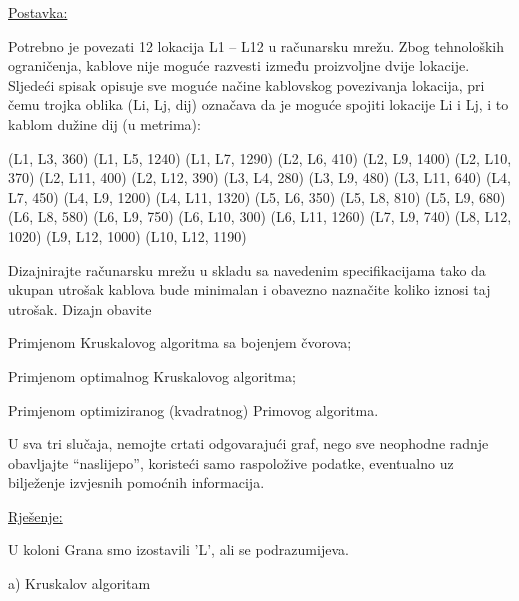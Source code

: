 \documentclass[12pt]{article}
\begin{document}
\underline{Postavka:}

Potrebno je povezati 12 lokacija L1 – L12 u računarsku mrežu. Zbog tehnoloških ograničenja, kablove nije moguće razvesti između proizvoljne dvije lokacije. Sljedeći spisak opisuje sve moguće načine kablovskog povezivanja lokacija, pri čemu trojka oblika (Li, Lj, dij) označava da je moguće spojiti lokacije Li i Lj, i to kablom dužine dij (u metrima): 

(L1, L3, 360)   (L1, L5, 1240)   (L1, L7, 1290)   (L2, L6, 410)   (L2, L9, 1400)   (L2, L10, 370)   (L2, L11, 400)   (L2, L12, 390)   (L3, L4, 280)   (L3, L9, 480)   (L3, L11, 640)   (L4, L7, 450)   (L4, L9, 1200)   (L4, L11, 1320)   (L5, L6, 350)   (L5, L8, 810)   (L5, L9, 680)   (L6, L8, 580)   (L6, L9, 750)   (L6, L10, 300)   (L6, L11, 1260)   (L7, L9, 740)   (L8, L12, 1020)   (L9, L12, 1000)   (L10, L12, 1190)   


Dizajnirajte računarsku mrežu u skladu sa navedenim specifikacijama tako da ukupan utrošak kablova bude minimalan i obavezno naznačite koliko iznosi taj utrošak. Dizajn obavite

Primjenom Kruskalovog algoritma sa bojenjem čvorova;

Primjenom optimalnog Kruskalovog algoritma;

Primjenom optimiziranog (kvadratnog) Primovog algoritma.


U sva tri slučaja, nemojte crtati odgovarajući graf, nego sve neophodne radnje obavljajte “naslijepo”, koristeći samo raspoložive podatke, eventualno uz bilježenje izvjesnih pomoćnih informacija.

\underline{Rješenje:}
\newpage

U koloni Grana smo izostavili 'L', ali se podrazumijeva.

a) Kruskalov algoritam
\end{document}
